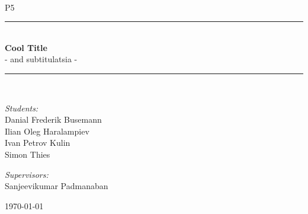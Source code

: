 \newcommand{\HRule}{\rule{\linewidth}{0.5 mm}}
\begin{titlepage}

\begin{center}
\\[0.5cm]

\textsc{\Large P5}\\[0.6cm]

\HRule \\[0.8cm]
{ \Huge \bfseries  Cool Title}\\[0.4cm]

  \Large{ - and subtitulatsia -
  }
\HRule \\[1.2cm]

\begin{minipage}{0.49\textwidth}
\begin{flushleft} \large
\emph{Students:}\\
Danial Frederik Busemann\\
Ilian Oleg Haralampiev\\
Ivan Petrov Kulin\\
Simon Thies\\
\end{flushleft}
\end{minipage}
\begin{minipage}{0.49\textwidth}
\begin{flushright} \large
\emph{Supervisors:} \\
Sanjeevikumar Padmanaban
\end{flushright}
\end{minipage}

\vfill

{\large \today}



\end{center}

\end{titlepage}
